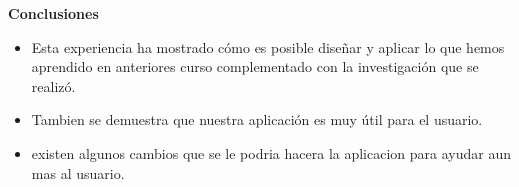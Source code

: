 \documentclass[a4paper,11pt]{article}
\begin{document}
\textbf{{\LARGE Conclusiones}}

\begin{itemize}
\item  Esta experiencia ha mostrado cómo es posible diseñar y aplicar lo que hemos aprendido en anteriores curso complementado con la investigación que se realizó.
\item Tambien se demuestra que nuestra aplicación es muy útil para el usuario.
\item existen algunos cambios que se le podria hacera la aplicacion para ayudar aun mas al usuario.

\end{itemize}
\end{document}
